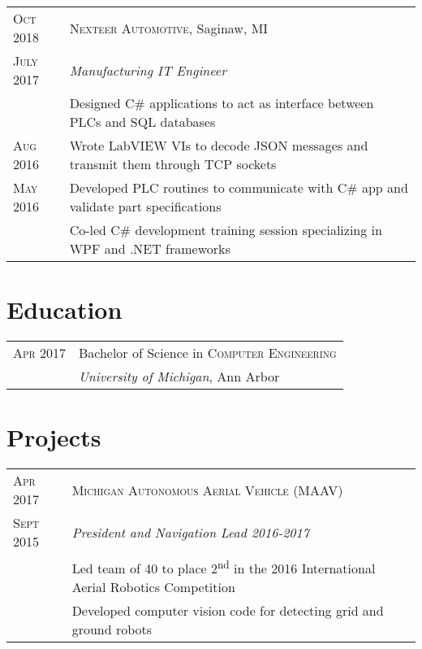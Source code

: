 \documentclass[a4paper,12pt]{article} %
\begin{document}

\begin{tabular}{R{2.1cm}|L{13.0cm}}
\textsc{Oct 2018} & \textsc{Nexteer Automotive}, Saginaw, MI \\
\textsc{July 2017} & \emph{Manufacturing IT Engineer} \\
& \footnotesize{Designed C\# applications to act as interface
  between PLCs and SQL databases} \\
\textsc{Aug 2016} & \footnotesize{Wrote LabVIEW VIs to decode JSON messages
  and transmit them through TCP sockets}\\
\textsc{May 2016} & \footnotesize{Developed PLC routines to communicate with C\#
  app and validate part specifications} \\
& \footnotesize{Co-led C\# development training session specializing in WPF and
 .NET frameworks}\\
\end{tabular}


\section{Education}

\begin{tabular}{R{2.1cm}|L{13.0cm}}
\textsc{Apr 2017} & Bachelor of Science in \textsc{Computer Engineering} \\
& \normalsize\emph{University of Michigan}, Ann Arbor \\
\end{tabular}


\section{Projects}

\begin{tabular}{R{2.1cm}|L{13.0cm}}
\textsc{Apr 2017} & \textsc{Michigan Autonomous Aerial Vehicle (MAAV)} \\
\textsc{Sept 2015} & \emph{President and Navigation Lead 2016-2017} \\
& \footnotesize{Led team of 40 to place 2\textsuperscript{nd} in the 2016
  International Aerial Robotics Competition} \\
& \footnotesize{Developed computer vision code for detecting grid and ground robots} \\
\end{tabular}
\end{document}
